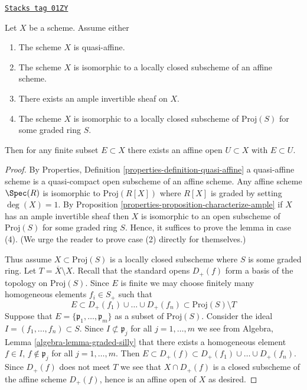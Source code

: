 \begin{lemma}
\label{properties-lemma-ample-finite-set-in-affine}
\href{https://stacks.math.columbia.edu/tag/01ZY}{\texttt{Stacks tag 01ZY}}

Let $X$ be a scheme. Assume either
\begin{enumerate}
\item The scheme $X$ is quasi-affine.
\item The scheme $X$ is isomorphic to a locally closed subscheme
of an affine scheme.
\item There exists an ample invertible sheaf on $X$.
\item The scheme $X$ is isomorphic to a locally closed subscheme
of $\text{Proj}(S)$ for some graded ring $S$.
\end{enumerate}
Then for any finite subset $E \subset X$ there exists an
affine open $U \subset X$ with $E \subset U$.
\end{lemma}

\begin{proof}

By Properties, Definition \ref{properties-definition-quasi-affine}
a quasi-affine scheme is a quasi-compact open subscheme
of an affine scheme. Any affine scheme $\Spec(R)$ is isomorphic to
$\text{Proj}(R[X])$ where $R[X]$ is graded by setting $\deg(X) = 1$.
By Proposition \ref{properties-proposition-characterize-ample}
if $X$ has an ample invertible sheaf then $X$ is isomorphic to an open
subscheme of $\text{Proj}(S)$ for some graded ring $S$.
Hence, it suffices to prove the lemma in case (4).
(We urge the reader to prove case (2) directly for themselves.)

\medskip\noindent
Thus assume $X \subset \text{Proj}(S)$ is a locally closed subscheme
where $S$ is some graded ring. Let $T = \overline{X} \setminus X$.
Recall that the standard opens $D_{+}(f)$ form a basis of the
topology on $\text{Proj}(S)$. Since $E$ is finite we may choose finitely many
homogeneous elements $f_i \in S_{+}$ such that
$$
E \subset
D_{+}(f_1) \cup \ldots \cup D_{+}(f_n) \subset
\text{Proj}(S) \setminus T
$$
Suppose that $E = \{\mathfrak p_1, \ldots, \mathfrak p_m\}$
as a subset of $\text{Proj}(S)$.
Consider the ideal $I = (f_1, \ldots, f_n) \subset S$.
Since $I \not \subset \mathfrak p_j$ for all $j = 1, \ldots, m$
we see from Algebra, Lemma \ref{algebra-lemma-graded-silly} that
there exists a homogeneous element $f \in I$, $f \not \in \mathfrak p_j$
for all $j = 1, \ldots, m$. Then $E \subset D_{+}(f) \subset
D_{+}(f_1) \cup \ldots \cup D_{+}(f_n)$. Since $D_{+}(f)$ does not
meet $T$ we see that $X \cap D_{+}(f)$ is a closed subscheme of the
affine scheme $D_{+}(f)$, hence is an affine open of $X$ as desired.
\end{proof}

